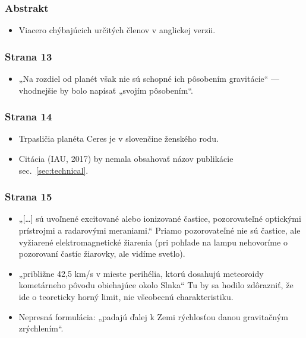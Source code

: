 \hypertarget{abstrakt}{%
\subsubsection{Abstrakt}\label{abstrakt}}

\begin{itemize}
\tightlist
\item
  Viacero chýbajúcich určitých členov v anglickej verzii.
\end{itemize}

\hypertarget{strana-13}{%
\subsubsection{Strana 13}\label{strana-13}}

\begin{itemize}
\tightlist
\item
  „Na rozdiel od planét však nie sú schopné ich pôsobením gravitácie“
  --- vhodnejšie by bolo napísať „svojím pôsobením“.
\end{itemize}

\hypertarget{strana-14}{%
\subsubsection{Strana 14}\label{strana-14}}

\begin{itemize}
\tightlist
\item
  Trpasličia planéta Ceres je v slovenčine ženského rodu.
\item
  Citácia (IAU, 2017) by nemala obsahovať názov publikácie
  sec.~\ref{sec:technical}.
\end{itemize}

\hypertarget{strana-15}{%
\subsubsection{Strana 15}\label{strana-15}}

\begin{itemize}
\tightlist
\item
  „{[}\ldots{}{]} sú uvoľnené excitované alebo ionizované častice,
  pozorovateľné optickými prístrojmi a radarovými meraniami.“ Priamo
  pozorovateľné nie sú častice, ale vyžiarené elektromagnetické žiarenia
  (pri pohľade na lampu nehovoríme o pozorovaní častíc žiarovky, ale
  vidíme svetlo).
\item
  „približne 42,5 km/s v mieste perihélia, ktorú dosahujú meteoroidy
  kometárneho pôvodu obiehajúce okolo Slnka“ Tu by sa hodilo zdôrazniť,
  že ide o teoreticky horný limit, nie všeobecnú charakteristiku.
\item
  Nepresná formulácia: „padajú ďalej k Zemi rýchlosťou danou gravitačným
  zrýchlením“.
\end{itemize}

